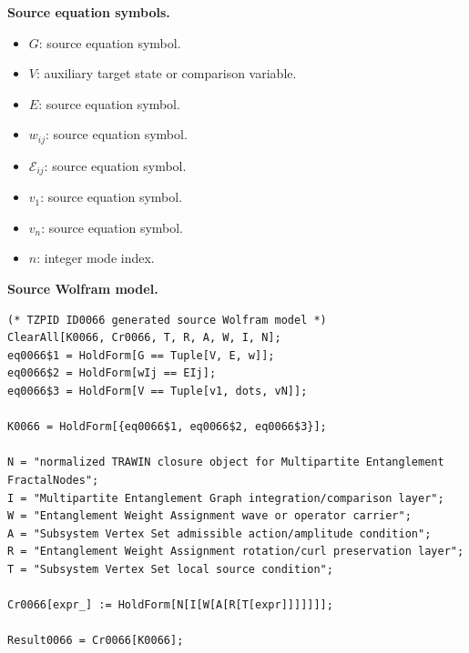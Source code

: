 \begin{minipage}[t]{0.49\linewidth}
\begingroup
\small
\raggedright
\textbf{Source equation symbols.}\par
\begin{itemize}[leftmargin=1.35em,itemsep=1pt,topsep=1pt,parsep=0pt]
    \item $G$: source equation symbol.
    \item $V$: auxiliary target state or comparison variable.
    \item $E$: source equation symbol.
    \item $w_{ij}$: source equation symbol.
    \item $\mathcal{E}_{ij}$: source equation symbol.
    \item $v_{1}$: source equation symbol.
    \item $v_{n}$: source equation symbol.
    \item $n$: integer mode index.
\end{itemize}
\endgroup
\end{minipage}\hfill
\begin{minipage}[t]{0.47\linewidth}
\begingroup
\scriptsize
\raggedright
\textbf{Source Wolfram model.}\par
\begin{Verbatim}[fontsize=\tiny,breaklines=true,breakanywhere=true]
(* TZPID ID0066 generated source Wolfram model *)
ClearAll[K0066, Cr0066, T, R, A, W, I, N];
eq0066$1 = HoldForm[G == Tuple[V, E, w]];
eq0066$2 = HoldForm[wIj == EIj];
eq0066$3 = HoldForm[V == Tuple[v1, dots, vN]];

K0066 = HoldForm[{eq0066$1, eq0066$2, eq0066$3}];

N = "normalized TRAWIN closure object for Multipartite Entanglement FractalNodes";
I = "Multipartite Entanglement Graph integration/comparison layer";
W = "Entanglement Weight Assignment wave or operator carrier";
A = "Subsystem Vertex Set admissible action/amplitude condition";
R = "Entanglement Weight Assignment rotation/curl preservation layer";
T = "Subsystem Vertex Set local source condition";

Cr0066[expr_] := HoldForm[N[I[W[A[R[T[expr]]]]]]];

Result0066 = Cr0066[K0066];
\end{Verbatim}
\endgroup
\end{minipage}

